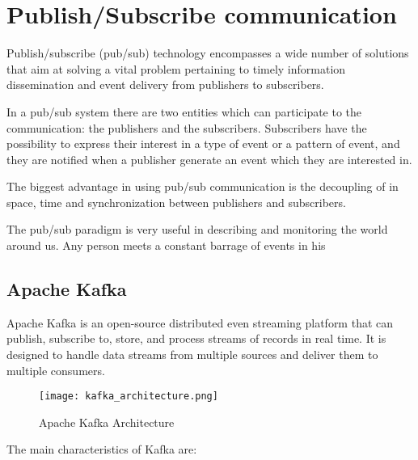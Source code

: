

\chapter{Publish/Subscribe communication}

Publish/subscribe (pub/sub) technology encompasses a wide number of solutions
that aim at solving a vital problem pertaining to timely information
dissemination and event delivery from publishers to subscribers.
\cite{Pub/Sub_pattern}

In a pub/sub system there are two entities which can participate to the
communication: the publishers and the subscribers.
Subscribers have the possibility to express their interest in a type of event
or a pattern of event, and they are notified when a publisher generate an event
which they are interested in.

The biggest advantage in using pub/sub communication is the decoupling of
in space, time and synchronization between publishers and subscribers.
\cite{Many_faces_of_pub/sub}

The pub/sub paradigm is very useful in describing and monitoring the world
around us. Any person meets a constant barrage of events in his 


\section{Apache Kafka}

Apache Kafka is an open-source distributed even streaming platform that can
publish, subscribe to, store, and process streams of records in real time.
It is designed to handle data streams from multiple sources and deliver them to
multiple consumers. \cite{garg2013apache}

\begin{figure}[ht]
    \centering
    \texttt{[image: kafka\_architecture.png]}
    \caption{Apache Kafka Architecture}
\end{figure}

The main characteristics of Kafka are:

